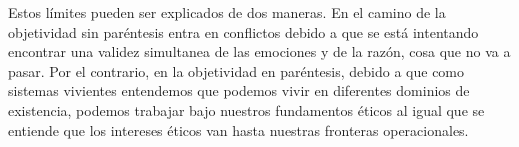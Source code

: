 \documentclass[10pt]{article}
\begin{document}
        Estos límites pueden ser explicados de dos maneras. En el camino de la objetividad sin paréntesis entra en conflictos debido a que se está intentando encontrar una validez simultanea de las emociones y de la razón, cosa que no va a pasar. Por el contrario, en la objetividad en paréntesis, debido a que como sistemas vivientes entendemos que podemos vivir en diferentes dominios de existencia, podemos trabajar bajo nuestros fundamentos éticos al igual que se entiende que los intereses éticos van hasta nuestras fronteras operacionales. 
\end{document}

